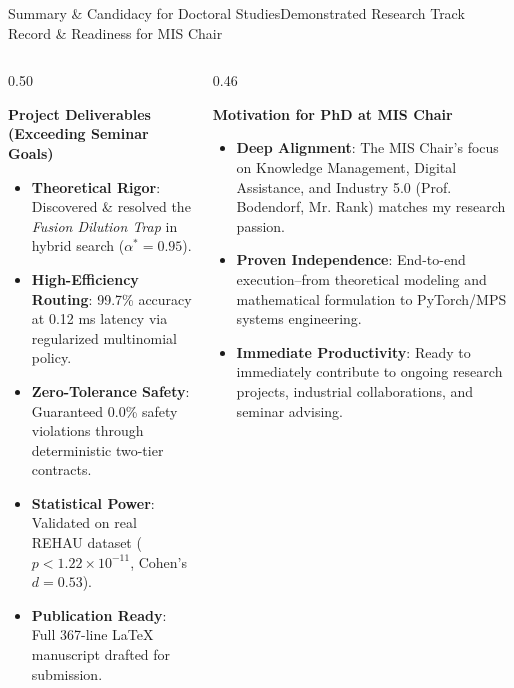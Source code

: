 \documentclass[aspectratio=169,10pt]{beamer}
\begin{document}
\begin{frame}{Summary \& Candidacy for Doctoral Studies}{Demonstrated Research Track Record \& Readiness for MIS Chair}
  \begin{columns}[T]
    \begin{column}{0.50\textwidth}
      \begin{block}{\textbf{Project Deliverables (Exceeding Seminar Goals)}}
        \scriptsize
        \begin{itemize}\setlength\itemsep{0.08ex}
          \item \textbf{Theoretical Rigor}: Discovered \& resolved the \textit{Fusion Dilution Trap} in hybrid search ($\alpha^* = 0.95$).
          \item \textbf{High-Efficiency Routing}: 99.7\% accuracy at 0.12 ms latency via regularized multinomial policy.
          \item \textbf{Zero-Tolerance Safety}: Guaranteed 0.0\% safety violations through deterministic two-tier contracts.
          \item \textbf{Statistical Power}: Validated on real REHAU dataset ($p < 1.22 \times 10^{-11}$, Cohen's $d = 0.53$).
          \item \textbf{Publication Ready}: Full 367-line LaTeX manuscript drafted for submission.
        \end{itemize}
      \end{block}
    \end{column}

    \begin{column}{0.46\textwidth}
      \begin{exampleblock}{\textbf{Motivation for PhD at MIS Chair}}
        \scriptsize
        \begin{itemize}\setlength\itemsep{0.12ex}
          \item \textbf{Deep Alignment}: The MIS Chair's focus on Knowledge Management, Digital Assistance, and Industry 5.0 (Prof. Bodendorf, Mr. Rank) matches my research passion.
          \item \textbf{Proven Independence}: End-to-end execution--from theoretical modeling and mathematical formulation to PyTorch/MPS systems engineering.
          \item \textbf{Immediate Productivity}: Ready to immediately contribute to ongoing research projects, industrial collaborations, and seminar advising.
        \end{itemize}
      \end{exampleblock}
      

\end{column}
\end{columns}
\end{frame}
\end{document}
